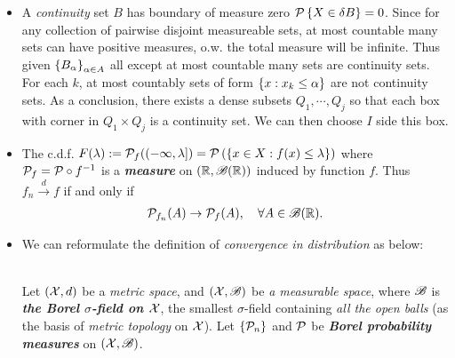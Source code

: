 \documentclass[11pt]{article}
\begin{document}
\begin{itemize}
\item \begin{remark}
A \emph{continuity} set $B$ has boundary of measure zero ${\mathcal P}\left\{X\in \delta B\right\}=0$. Since for any collection of pairwise disjoint measureable sets, at most countable many sets can have positive measures, o.w. the total measure will be infinite. Thus given $\left\{B_{\alpha}\right\}_{\alpha\in A}$ all except at most countable many sets are continuity sets. For each $k$, at most countably sets of form $\left\{x: x_{k}\le \alpha\right\}$ are not continuity sets. As a conclusion, there exists a dense subsets $Q_{1},\cdots, Q_{j}$ so that each box with corner in $Q_{1}\times Q_{j}$ is a continuity set. We can then choose $I$ side this box.
\end{remark}

\item \begin{remark}
The c.d.f.  $F(\lambda) := {\mathcal P}_{f}((-\infty, \lambda])= {\mathcal P}\left(\left\{x \in  X : f(x) \le \lambda\right\}\right)$ where  ${\mathcal P}_f = {\mathcal P}\circ f^{-1}$ is a \emph{\textbf{measure}} on $({\mathbb R}, {\mathscr B}({\mathbb R}))$ induced by function $f$.  Thus $f_{n}\stackrel{d}{\rightarrow} f$ if and only if 
\begin{align*}
{\mathcal P}_{f_n}(A)  \rightarrow {\mathcal P}_f(A), \quad \forall A \in {\mathscr B}({\mathbb R}).
\end{align*} 
\end{remark}


\item We can reformulate the definition of \emph{convergence in distribution} as below:
\begin{definition} \citep{wellner2013weak}\\
Let $({\mathcal X}, d)$ be a \emph{metric space}, and $({\mathcal X}, {\mathscr B})$ be \emph{a measurable space}, where ${\mathscr B}$ is \emph{\textbf{the Borel $\sigma$-field on ${\mathcal X}$}}, the smallest $\sigma$-field containing \emph{all the open balls} (as the basis of \emph{metric topology} on ${\mathcal X}$). Let $\{{\mathcal P}_n \}$ and ${\mathcal P}$ be \emph{\textbf{Borel probability measures}} on $({\mathcal X}, {\mathscr B})$.


\end{definition}
\end{itemize}
\end{document}
